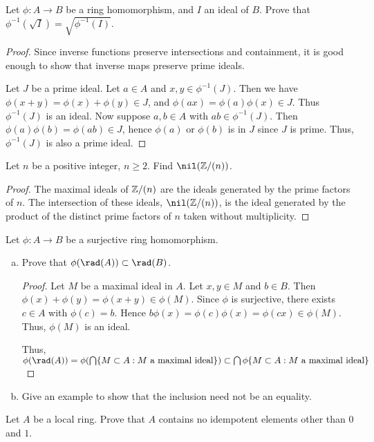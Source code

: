 \documentclass{article}
\begin{document}
 Let $\phi: A \to B$ be a ring homomorphism, and $I$ an ideal of $B$. Prove that $\phi^{-1}(\sqrt I) = \sqrt{\phi^{-1}(I)}$.

\begin{proof}

Since inverse functions preserve intersections and containment, it is good enough to show that inverse maps preserve prime ideals. 

Let $J$ be a prime ideal.  Let $a \in A$ and $x,y \in \phi^{-1}(J)$.  Then we have $\phi(x + y) = \phi(x) + \phi(y) \in J$, and $\phi(ax) = \phi(a)\phi(x) \in J$.  Thus $\phi^{-1}(J)$ is an ideal.   Now suppose $a,b \in A$ with $ab \in \phi^{-1}(J)$.  Then $\phi(a)\phi(b) = \phi(ab) \in J$,  hence $\phi(a)$ or $\phi(b)$ is in $J$ since $J$ is prime.  Thus, $\phi^{-1}(J)$ is also a prime ideal.
\end{proof}

 Let $n$ be a positive integer, $n \ge 2$. Find $\nil(\Z/(n))$.
\begin{proof}
The maximal ideals of $\mathbb{Z}/(n)$ are the ideals generated by the prime factors of $n$.  The intersection of these ideals, $\nil(\Z/(n))$,  is the ideal generated by the product of the distinct prime factors of $n$ taken without multiplicity.
\end{proof}

 Let $\phi: A \to B$ be a surjective ring homomorphism.
\begin{enumerate}[(a)]
\item Prove that $\phi(\rad(A)) \subset \rad(B)$.
\begin{proof}

Let $M$ be a maximal ideal in $A$. Let $x, y \in M$ and $b \in B$.  Then $\phi(x) + \phi(y) = \phi(x + y) \in \phi(M)$. Since $\phi$ is surjective, there exists  $c \in A$ with $\phi(c) = b$. Hence $b\phi(x) = \phi(c) \phi(x) = \phi(cx) \in \phi(M)$.  Thus, $\phi(M)$ is an ideal.

Thus, $\phi(\rad(A)) = \phi(\bigcap \{M \subset A: M \text{ a maximal ideal}\}) \subset \bigcap \phi \{M \subset A : M \text{ a maximal ideal}\}$
\subset 

\end{proof}
\item Give an example to show that the inclusion need not be an equality.
\end{enumerate}

 Let $A$ be a local ring.  Prove that $A$ contains no idempotent elements other than $0$ and $1$.
\end{document}
